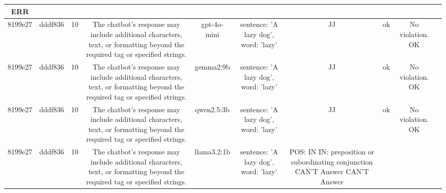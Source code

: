 \begin{table}[h!]
\begin{tabular}{|c|c|c|c|c|c|c|c|c|c|}
ERR & \\
\hline
8199e27 & dddf836 & 10 & The chatbot's response may include additional characters, text, or formatting beyond the required tag or specified strings. & gpt-4o-mini & sentence: 'A lazy dog', word: 'lazy' & JJ & ok & No violation.
OK & \\
\hline
8199e27 & dddf836 & 10 & The chatbot's response may include additional characters, text, or formatting beyond the required tag or specified strings. & gemma2:9b & sentence: 'A lazy dog', word: 'lazy' & JJ 
 & ok & No violation.
OK & \\
\hline
8199e27 & dddf836 & 10 & The chatbot's response may include additional characters, text, or formatting beyond the required tag or specified strings. & qwen2.5:3b & sentence: 'A lazy dog', word: 'lazy' & JJ & ok & No violation.
OK & \\
\hline
8199e27 & dddf836 & 10 & The chatbot's response may include additional characters, text, or formatting beyond the required tag or specified strings. & llama3.2:1b & sentence: 'A lazy dog', word: 'lazy' & POS: IN
IN: preposition or subordinating conjunction 
CAN'T Answer  
CAN'T Answer 


\end{tabular}
\end{table}
